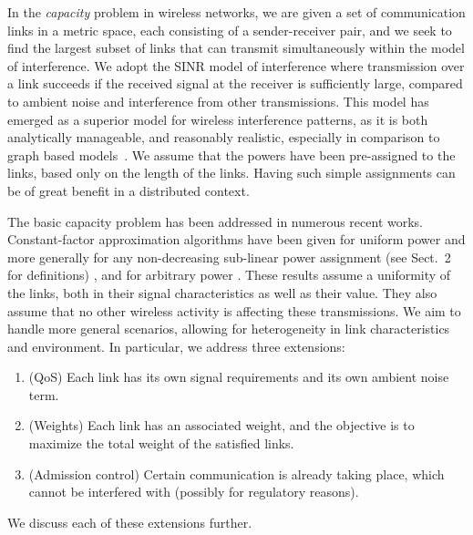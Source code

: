 \documentclass[11pt]{amsart}
\begin{document}
In the \emph{capacity} problem in wireless networks, we are given a
set of communication links in a metric space, each consisting of
a sender-receiver pair, and we seek to find the largest subset of links
that can transmit simultaneously within the model of interference.  We
adopt the SINR model of interference where transmission over a link
succeeds if the received signal at the receiver is sufficiently large,
compared to ambient noise and interference from other transmissions.
This model has emerged as a superior model for wireless interference
patterns, as it is both analytically manageable, and reasonably
realistic, especially in comparison to graph based
models~\cite{GronkMibiHoc01,MaheshwariJD08,Moscibroda2006Protocol}.
We assume that the powers have been pre-assigned to the links, based
only on the length of the links. Having such simple assignments can be of great benefit
in a distributed context.

The basic capacity problem has been addressed in numerous recent
works. Constant-factor approximation algorithms have been given for
uniform power \cite{GHWW09} and more generally for any non-decreasing
sub-linear power assignment (see Sect.~2 for definitions) \cite{SODA11}, and for arbitrary power 
\cite{KesselheimSoda11}. 
These results assume a uniformity of the links, both in their signal
characteristics as well as their value. They also assume that no other
wireless activity is affecting these transmissions. 
We aim to handle more general scenarios, allowing for heterogeneity in
link characteristics and environment.
In particular, we address three extensions:
\begin{enumerate}
 \item (QoS) Each link has its own signal requirements and its own
   ambient noise term.
 \item (Weights) Each link has an associated weight, and the
   objective is to maximize the total weight of the satisfied links.
 \item (Admission control) Certain communication is already taking
   place, which cannot be interfered with (possibly for regulatory reasons).
\end{enumerate}
We discuss each of these extensions further.

\iffalse
We consider the fundamental \emph{capacity} problem in wireless networks.
Given is a set of communication links $L = \{\ell_1, \ell_2, \ldots \ell_n\}$, where a link $\ell_v \in L$ is a directed pair of a ``sender'' $s_v$ and a ``receiver'' $r_v$. Senders and receivers are points in a metric space. Each link represents a intended wireless communication from the sender to the receiver.
The \emph{capacity} of this network is the size of the largest subset of $L$ that
can successfully transmit simultaneously, given some model of interference among simultaneously transmitting links.
\fi
\end{document}
